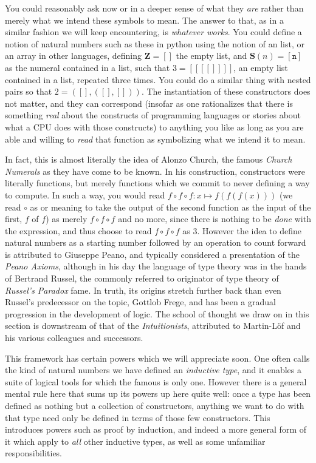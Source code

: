 \documentclass[11pt]{article}
\begin{document}
You could reasonably ask now  or  in a deeper sense of what they \emph{are} rather than merely what we intend these symbols to mean. The answer to that, as in a similar fashion we will keep encountering, is \emph{whatever works}. You could define a notion of natural numbers such as these in python using the notion of an list, or an array in other languages, defining $\mathbf{Z} = \mathtt{[]}$ the empty list, and $\mathbf{S}(n) = \mathtt{[n]}$ as the numeral contained in a list, such that $3 = \mathtt{[[[[]]]]}$, an empty list contained in a list, repeated three times. You could do a similar thing with nested pairs so that $2 = \mathtt{([],([],[]))}$. The instantiation of these constructors does not matter, and they can correspond  (insofar as one rationalizes that there is something \emph{real} about the constructs of programming languages or stories about what a CPU does with those constructs) to anything you like as long as you are able and willing to \emph{read} that function as symbolizing what we intend it to mean.

In fact, this is almost literally the idea of Alonzo Church, the famous \emph{Church Numerals} as they have come to be known. In his construction, constructors were literally functions, but merely functions which we commit to never defining a way to compute. In such a way, you would read $f \circ f \circ f\colon x \mapsto f(f(f(x)))$ (we read $\circ$ as  or  meaning to take the output of the second function as the input of the first, $f$ of $f$) as merely $f \circ f \circ f$ and no more, since there is nothing to be \emph{done} with the expression, and thus choose to read $f \circ f \circ f$ as $3$. However the idea to define natural numbers as a starting number followed by an operation to count forward is attributed to Giuseppe Peano, and typically considered a presentation of the \emph{Peano Axioms}, although in his day the language of type theory was in the hands of Bertrand Russel, the commonly referred to originator of type theory of \emph{Russel's Paradox} fame. In truth, its origins stretch further back than even Russel's predecessor on the topic, Gottlob Frege, and has been a gradual progression in the development of logic. The school of thought we draw on in this section is downstream of that of the \emph{Intuitionists}, attributed to Martin-Löf and his various colleagues and successors.

This framework has certain powers which we will appreciate soon. One often calls the kind of natural numbers we have defined an \emph{inductive type}, and it enables a suite of logical tools for which the famous  is only one. However there is a general mental rule here that sums up its powers up here quite well: once a type has been defined as nothing but a collection of constructors, anything we want to do with that type need only be defined in terms of those few constructors. This introduces powers such as proof by induction, and indeed a more general form of it which apply to \emph{all} other inductive types, as well as some unfamiliar responsibilities.
\end{document}
